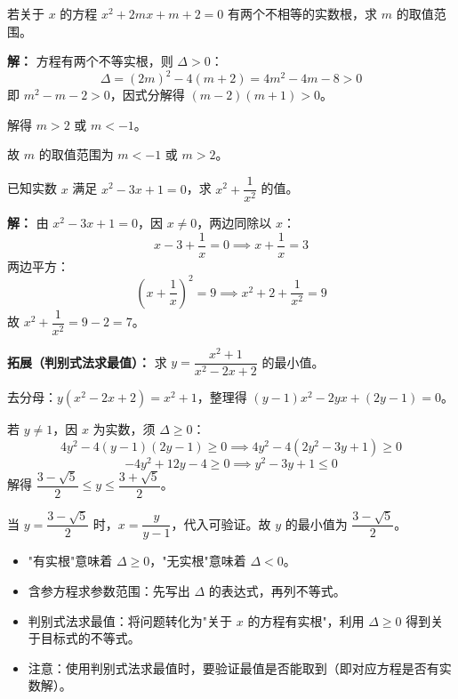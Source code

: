 \documentclass[12pt, a4paper]{ctexart}
\begin{document}
\begin{examplebox}[【例12】判别式求参数范围]
若关于 $x$ 的方程 $x^2 + 2mx + m + 2 = 0$ 有两个不相等的实数根，求 $m$ 的取值范围。
\end{examplebox}

\textbf{解：} 方程有两个不等实根，则 $\Delta > 0$：
\[
\Delta = (2m)^2 - 4(m+2) = 4m^2 - 4m - 8 > 0
\]
即 $m^2 - m - 2 > 0$，因式分解得 $(m-2)(m+1) > 0$。

解得 $m > 2$ 或 $m < -1$。

故 $m$ 的取值范围为 $\boxed{m < -1 \text{ 或 } m > 2}$。

\begin{examplebox}[【例13】判别式法求最值]
已知实数 $x$ 满足 $x^2 - 3x + 1 = 0$，求 $x^2 + \dfrac{1}{x^2}$ 的值。
\end{examplebox}

\textbf{解：} 由 $x^2 - 3x + 1 = 0$，因 $x \neq 0$，两边同除以 $x$：
\[
x - 3 + \frac{1}{x} = 0 \implies x + \frac{1}{x} = 3
\]
两边平方：
\[
\left(x+\frac{1}{x}\right)^2 = 9 \implies x^2 + 2 + \frac{1}{x^2} = 9
\]
故 $x^2 + \dfrac{1}{x^2} = 9 - 2 = \boxed{7}$。

\textbf{拓展（判别式法求最值）：} 求 $y = \dfrac{x^2+1}{x^2-2x+2}$ 的最小值。

去分母：$y(x^2-2x+2) = x^2+1$，整理得 $(y-1)x^2 - 2yx + (2y-1) = 0$。

若 $y \neq 1$，因 $x$ 为实数，须 $\Delta \geqslant 0$：
\[
4y^2 - 4(y-1)(2y-1) \geqslant 0 \implies 4y^2 - 4(2y^2 - 3y + 1) \geqslant 0
\]
\[
-4y^2 + 12y - 4 \geqslant 0 \implies y^2 - 3y + 1 \leqslant 0
\]
解得 $\dfrac{3-\sqrt{5}}{2} \leqslant y \leqslant \dfrac{3+\sqrt{5}}{2}$。

当 $y = \dfrac{3-\sqrt{5}}{2}$ 时，$x = \dfrac{y}{y-1}$，代入可验证。故 $y$ 的最小值为 $\boxed{\dfrac{3-\sqrt{5}}{2}}$。

\begin{tipbox}[判别式法要点总结]
\begin{itemize}[leftmargin=1.5em]
  \item "有实根"意味着 $\Delta \geqslant 0$，"无实根"意味着 $\Delta < 0$。
  \item 含参方程求参数范围：先写出 $\Delta$ 的表达式，再列不等式。
  \item 判别式法求最值：将问题转化为"关于 $x$ 的方程有实根"，利用 $\Delta \geqslant 0$ 得到关于目标式的不等式。
  \item 注意：使用判别式法求最值时，要验证最值是否能取到（即对应方程是否有实数解）。
\end{itemize}
\end{tipbox}
\end{document}

